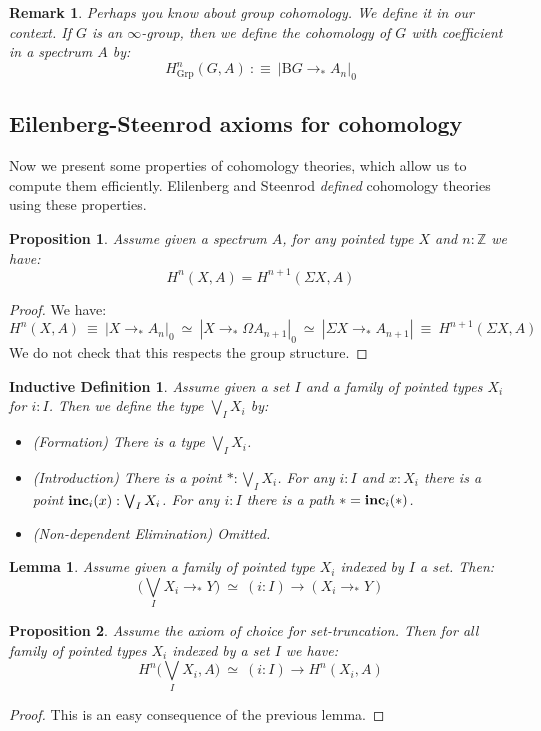 \documentclass{article}
\newcommand{\sse}[1]{\medbreak \subsection{#1}}
\renewcommand{\r}{\rightarrow}
\newcommand{\Grp}{\mathrm{Grp}}
\newcommand{\B}{\mathrm{B}}
\newtheorem{lemma}{Lemma}
\newtheorem{proposition}{Proposition}
\newtheorem{remark}{Remark}
\newtheorem{ind_def}{Inductive Definition}
\begin{document}
\begin{remark}
Perhaps you know about group cohomology. We define it in our context. If $G$ is an $\infty$-group, then we define the cohomology of $G$ with coefficient in a spectrum $A$ by:
\[H^n_\Grp(G,A) \ :\equiv\ |\B G \r_* A_n|_0\]
\end{remark}


\sse{Eilenberg-Steenrod axioms for cohomology}

Now we present some properties of cohomology theories, which allow us to compute them efficiently. Elilenberg and Steenrod \emph{defined} cohomology theories using these properties. %

\begin{proposition}
Assume given a spectrum $A$, for any pointed type $X$ and $n:\mathbb{Z}$ we have:
\[H^n(X,A) = H^{n+1}(\Sigma X,A)\]
\end{proposition}
\begin{proof}
We have:
\[H^n(X,A) \ \equiv\ |X\r_* A_n|_0 \ \simeq \ |X\r_*\Omega A_{n+1}|_0 \ \simeq \ |\Sigma X \r_* A_{n+1}| \ \equiv\ H^{n+1}(\Sigma X , A)\]
We do not check that this respects the group structure.
\end{proof}

\begin{ind_def}
Assume given a set $I$ and a family of pointed types $X_i$ for $i:I$. Then we define the type $\bigvee_I X_i$ by:
\begin{itemize}
\item (Formation) There is a type $\bigvee_I X_i$.
\item (Introduction) There is a point $*:\bigvee_I X_i$.
For any $i:I$ and $x:X_i$ there is a point $\mathrm{\bf inc}_i(x) : \bigvee_I X_i$.
For any $i:I$ there is a path $* = \mathrm{\bf inc}_i(*)$.
\item (Non-dependent Elimination) Omitted.
\end{itemize} 
\end{ind_def}

\begin{lemma}
Assume given a family of pointed type $X_i$ indexed by $I$ a set. Then:
\[\big(\bigvee_I X_i \r_* Y\big) \ \simeq\ (i:I) \r (X_i\r_* Y)\]
\end{lemma}

\begin{proposition}
Assume the axiom of choice for set-truncation. Then for all family of pointed types $X_i$ indexed by a set $I$ we have:
\[H^n\big(\bigvee_I X_i , A\big) \ \simeq\ (i:I) \r H^n(X_i,A)\]
\end{proposition}
\begin{proof}
This is an easy consequence of the previous lemma.
\end{proof}
\end{document}
